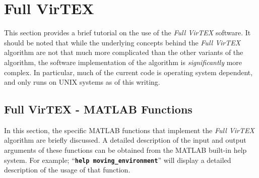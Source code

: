 \documentclass[12pt, letterpaper, oneside]{article}
\begin{document}
\section{Full VirTEX}
This section provides a brief tutorial on the use of the {\em Full VirTEX}
software. It should be noted that while the underlying concepts behind
the {\em Full VirTEX} algorithm are not that much more complicated than
the other variants of the algorithm, the software implementation of the
algorithm is {\em significantly} more complex. In particular, much of
the current code is operating system dependent, and only runs on UNIX
systems as of this writing.


\subsection{Full VirTEX - MATLAB Functions}
In this section, the specific MATLAB functions that implement the {\em
Full VirTEX} algorithm are briefly discussed. A detailed description
of the input and output arguments of these functions can be obtained
from the MATLAB built-in help system.  For example; ``{\tt \bf help
moving\_environment}'' will display a detailed description of the usage
of that function.
\end{document}
